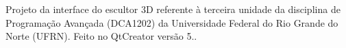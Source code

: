 Projeto da interface do escultor 3D referente à terceira unidade da disciplina de Programação Avançada (DCA1202) da Universidade Federal do Rio Grande do Norte (UFRN). Feito no Qt\+Creator versão 5.. 
